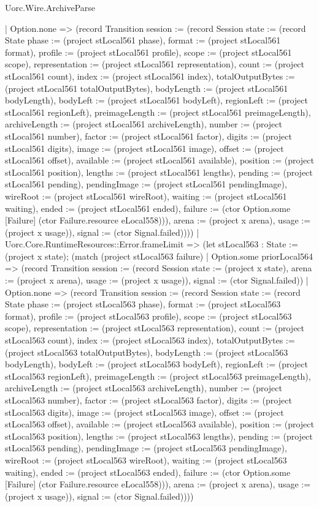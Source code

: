 \begin{lexlean}{Uorc.Wire.ArchiveParse}
\begin{semanticmodule}
{        | Option.none => (record Transition {session := (record Session {state := (record State {phase := (project stLocal561 phase), format := (project stLocal561 format), profile := (project stLocal561 profile), scope := (project stLocal561 scope), representation := (project stLocal561 representation), count := (project stLocal561 count), index := (project stLocal561 index), totalOutputBytes := (project stLocal561 totalOutputBytes), bodyLength := (project stLocal561 bodyLength), bodyLeft := (project stLocal561 bodyLeft), regionLeft := (project stLocal561 regionLeft), preimageLength := (project stLocal561 preimageLength), archiveLength := (project stLocal561 archiveLength), number := (project stLocal561 number), factor := (project stLocal561 factor), digits := (project stLocal561 digits), image := (project stLocal561 image), offset := (project stLocal561 offset), available := (project stLocal561 available), position := (project stLocal561 position), lengths := (project stLocal561 lengths), pending := (project stLocal561 pending), pendingImage := (project stLocal561 pendingImage), wireRoot := (project stLocal561 wireRoot), waiting := (project stLocal561 waiting), ended := (project stLocal561 ended), failure := (ctor Option.some [Failure] (ctor Failure.resource eLocal558))}), arena := (project x arena), usage := (project x usage)}), signal := (ctor Signal.failed)})))
      | Uorc.Core.RuntimeResources::Error.frameLimit => (let stLocal563 : State := (project x state); (match (project stLocal563 failure)
        | Option.some priorLocal564 => (record Transition {session := (record Session {state := (project x state), arena := (project x arena), usage := (project x usage)}), signal := (ctor Signal.failed)})
        | Option.none => (record Transition {session := (record Session {state := (record State {phase := (project stLocal563 phase), format := (project stLocal563 format), profile := (project stLocal563 profile), scope := (project stLocal563 scope), representation := (project stLocal563 representation), count := (project stLocal563 count), index := (project stLocal563 index), totalOutputBytes := (project stLocal563 totalOutputBytes), bodyLength := (project stLocal563 bodyLength), bodyLeft := (project stLocal563 bodyLeft), regionLeft := (project stLocal563 regionLeft), preimageLength := (project stLocal563 preimageLength), archiveLength := (project stLocal563 archiveLength), number := (project stLocal563 number), factor := (project stLocal563 factor), digits := (project stLocal563 digits), image := (project stLocal563 image), offset := (project stLocal563 offset), available := (project stLocal563 available), position := (project stLocal563 position), lengths := (project stLocal563 lengths), pending := (project stLocal563 pending), pendingImage := (project stLocal563 pendingImage), wireRoot := (project stLocal563 wireRoot), waiting := (project stLocal563 waiting), ended := (project stLocal563 ended), failure := (ctor Option.some [Failure] (ctor Failure.resource eLocal558))}), arena := (project x arena), usage := (project x usage)}), signal := (ctor Signal.failed)})))
}
\end{semanticmodule}
\end{lexlean}
